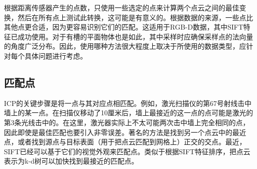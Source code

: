 
根据距离传感器产生的点数，只使用一些选定的点来计算两个点云之间的最佳变换，然后在所有点上测试此转换，这可能是有意义的。根据数据的来源，一些点比其他点更合适，因为更容易识别它们的匹配。这适用于RGB-D数据，其中SIFT特征已成功使用。对于有槽的平面物体也是如此，其中采样时应确保采样点的法向量的角度广泛分布。因此，使用哪种方法很大程度上取决于所使用的数据类型，应针对每个具体问题进行考虑。


\subsection{匹配点}
ICP的关键步骤是将一点与其对应点相匹配。例如，激光扫描仪的第67号射线击中墙上的某一点。在扫描仪移动了10厘米后，墙上最接近的这一点的点可能是激光的第3条光线击中的。在这里，激光器实际上不太可能两次击中墙上完全相同的点，因此即使是最佳匹配也要引入非零误差。著名的方法是找到另一个点云中的最近点，或者找到源点与目标表面（用于把点云匹配到网格上）正交的交点。最近，SIFT已经可以基于它们的视觉外观来匹配点。类似于根据SIFT特征排序，把点云表示为k-d树可以加快找到最接近的匹配点。

